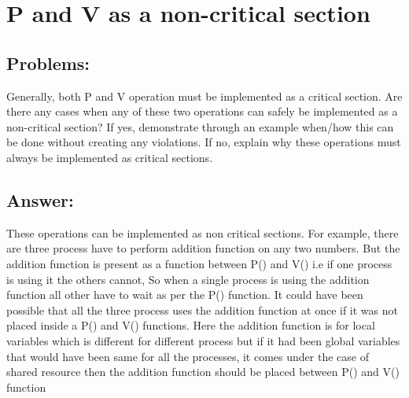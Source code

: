 \newpage
\section{P and V as a non-critical section}
\subsection{Problems:}
Generally, both P and V operation must be implemented as a critical section. Are there any cases
when any of these two operations can safely be implemented as a non-critical section? If yes,
demonstrate through an example when/how this can be done without creating any violations. If
no, explain why these operations must always be implemented as critical sections. 
\subsection{Answer:}

These operations can be implemented as non critical sections.
For example, there are three process have to perform addition function on any two numbers. But the addition function is present as a function between P() and V() i.e if one process is using it the others cannot, So when a single process is using the addition function all other have to wait as per the P() function. It could have been possible that all the three process uses the addition function at once if it was not placed inside a P() and V() functions. Here the addition function is for local variables which is different for different process but if it had been global variables that would have been same for all the processes, it comes under the case of shared resource then the addition function should be placed between P() and V() function
